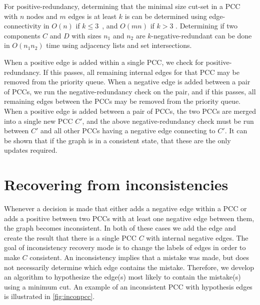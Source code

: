 For positive-redundancy, determining that the minimal size cut-set in a PCC with $n$ nodes and $m$ edges is at
least $k$ is can be determined using edge-connectivity in $O(n)$ if $k \leq
3$~\cite{eswaran_augmentation_1976,wang_simple_2015}, and $O(mn)$ if $k > 3$ \cite{esfahanian_connectivity_2017}.
Determining if two components $C$ and $D$ with sizes $n_1$ and $n_2$ are $k$-negative-redundant can be done in
$O(n_1 n_2)$ time using adjacency lists and set intersections.

  \kredun{}

When a positive edge is added within a single PCC, we check for positive-redundancy. If this passes, all remaining
internal edges for that PCC may be  removed from the priority queue. When a negative edge is added between a pair
of PCCs, we run the negative-redundancy check on the pair, and if this passes, all remaining edges between the PCCs
may be removed from the priority queue. When a positive edge is added between a pair of PCCs, the two PCCs are
merged into a single new PCC $C'$, and the above negative-redundancy check must be run between $C'$ and all other
PCCs having a negative edge connecting to $C'$. It can be shown that if the graph is in a consistent state, that
these are the only updates required.

\section{Recovering from inconsistencies}\label{sec:incon}
Whenever a decision is made that either adds a negative edge within a PCC or adds a positive between two PCCs with
at least one negative edge between them, the graph becomes inconsistent. In both of these cases we add the edge and
create the result that there is a single PCC $C$ with internal negative edges. The goal of inconsistency recovery
mode is to change the labels of edges in order to make $C$ consistent. An inconsistency implies that a mistake was
made, but does not necessarily determine which edge contains the mistake. Therefore, we develop an algorithm to
hypothesize the edge(s) most likely to contain the mistake(s) using a minimum cut. An example of an inconsistent
PCC with hypothesis edges is illustrated in \cref{fig:inconpcc}.

\inconpcc{}

